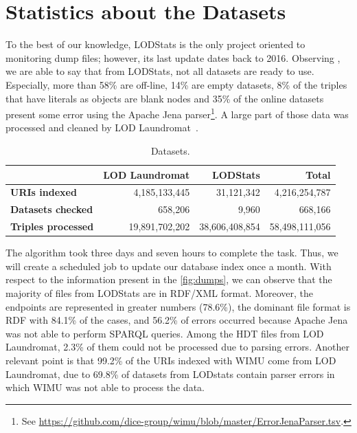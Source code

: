 \section{Statistics about the Datasets}


To the best of our knowledge, LODStats\cite{auer2012lodstats} is the only project oriented to monitoring dump files; however, its last update dates back to 2016. 
Observing , we are able to say that from LODStats, not all datasets are ready to use.
Especially, more than 58\% are off-line, 14\% are empty datasets, 8\% of the triples that have literals as objects are blank nodes and 35\% of the online datasets present some error using the Apache Jena parser\footnote{See \url{https://github.com/dice-group/wimu/blob/master/ErrorJenaParser.tsv}.}. 
A large part of those data was processed and cleaned by LOD Laundromat~\cite{beek2014lod}.


\setlength{\tabcolsep}{0.5em} %
\begin{table}[H]
	\centering
	\caption{Datasets.}
	\label{tab:lodstats}
    \begin{tabular}{lrrr}
    \toprule
    & \textbf{LOD Laundromat} & \textbf{LODStats} & \textbf{Total} \\ 
    \midrule
    \textbf{URIs indexed} & 4,185,133,445 & 31,121,342 & 4,216,254,787 \\
    \textbf{Datasets checked} & 658,206 & 9,960 & 668,166 \\
    \textbf{Triples processed} & 19,891,702,202 & 38,606,408,854 & 58,498,111,056 \\
    \bottomrule
    \end{tabular}
\end{table}

The algorithm took three days and seven hours to complete the task. 
Thus, we will create a scheduled job to update our database index once a month.
With respect to the information present in the \cref{fig:dumps}, we can observe that the majority of files from LODStats are in RDF/XML format.
Moreover, the endpoints are represented in greater numbers (78.6\%), the dominant file format is RDF with 84.1\% of the cases, and 56.2\% of errors occurred because Apache Jena was not able to perform SPARQL queries.
Among the HDT files from LOD Laundromat, 2.3\% of them could not be processed due to parsing errors.
Another relevant point is that 99.2\% of the URIs indexed with WIMU come from LOD Laundromat, due to 69.8\% of datasets from LODstats contain parser errors in which WIMU was not able to process the data.

